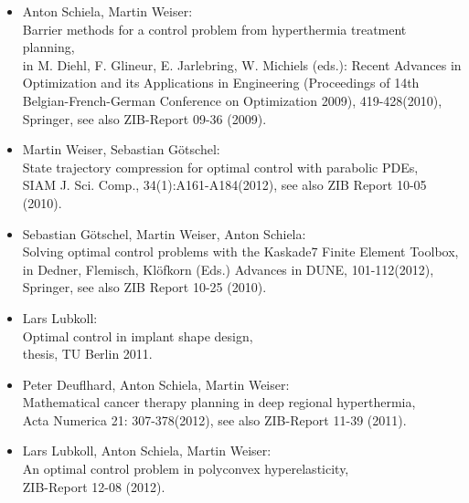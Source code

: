 \documentclass[11pt]{article}
\begin{document}
\begin{itemize}
\item 
Anton Schiela, Martin Weiser:\\
Barrier methods for a control problem from hyperthermia treatment planning,\\
in M. Diehl, F. Glineur, E. Jarlebring, W. Michiels (eds.): Recent Advances in Optimization and its 
Applications in Engineering (Proceedings of 14th Belgian-French-German Conference 
on Optimization 2009), 419-428(2010), Springer, 
see also ZIB-Report 09-36 (2009).

\item 
Martin Weiser, Sebastian G\"{o}tschel: \\
State trajectory compression for optimal control
with parabolic {PDEs}, \\
SIAM J. Sci. Comp., 34(1):A161-A184(2012), see also ZIB Report 10-05 (2010).

\item
Sebastian G\"{o}tschel, Martin Weiser, Anton Schiela:\\
Solving optimal control problems with the Kaskade7 Finite Element Toolbox,\\
in Dedner, Flemisch, Kl\"{o}fkorn (Eds.) Advances in DUNE, 101-112(2012), Springer,
see also ZIB Report 10-25 (2010).

\item Lars Lubkoll:\\
Optimal control in implant shape design,\\
thesis, TU Berlin 2011.

\item 
Peter Deuflhard, Anton Schiela, Martin Weiser:\\
Mathematical cancer therapy planning in deep regional hyperthermia,\\
Acta Numerica 21: 307-378(2012), see also ZIB-Report 11-39 (2011).

\item 
Lars Lubkoll, Anton Schiela, Martin Weiser:\\
An optimal control problem in polyconvex hyperelasticity,\\
ZIB-Report 12-08 (2012).

\end{itemize}


% 
% 



\end{document}
